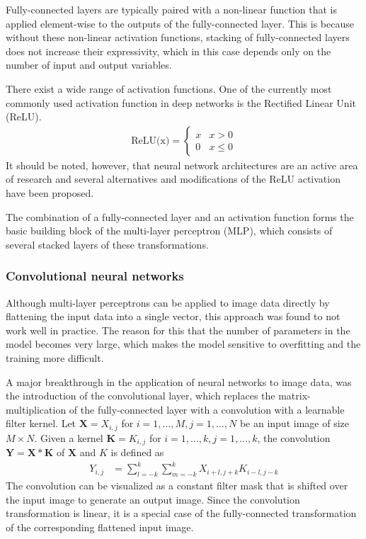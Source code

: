 \begin{description}
  Fully-connected layers are typically paired with a non-linear function that is
  applied element-wise to the outputs of the fully-connected layer. This is
  because without these non-linear activation functions, stacking of
  fully-connected layers does not increase their expressivity, which in this
  case depends only on the number of input and output variables.

  There exist a wide range of activation functions. One of the currently most
  commonly used activation function in deep networks is the Rectified Linear
  Unit (ReLU).
  \begin{align}
    \text{ReLU(x)} = \begin{cases}
      x & x > 0 \\
      0 & x \leq 0
    \end{cases}
  \end{align}
  It should be noted, however, that neural network architectures are an active area of
  research and several alternatives and modifications of the ReLU activation have
  been proposed.

  The combination of a fully-connected layer and an activation function forms
  the basic building block of the multi-layer perceptron (MLP), which consists
  of several stacked layers of these transformations.

\subsubsection{Convolutional neural networks}

Although multi-layer perceptrons can be applied to image data directly by
flattening the input data into a single vector, this approach was found to not
work well in practice. The reason for this that the number of parameters in the
model becomes very large, which makes the model sensitive to overfitting and the
training more difficult.

A major breakthrough in the application of neural networks to image data, was the
introduction of the convolutional layer, which replaces the matrix-multiplication
of the fully-connected layer with a convolution with a learnable filter kernel.
Let $\bm{X} = X_{i, j}$ for $i = 1, \dots, M, j = 1, \ldots, N$ be an input image
of size $M \times N$. Given a kernel $\bm{K} = K_{i, j}$ for
$i = 1, \ldots, k, j = 1, \ldots, k$, the convolution $\bm{Y} = \bm{X} * \bm{K}$ of
$\bm{X}$ and $K$ is defined as
\begin{align}
  Y_{i, j} &= \sum_{l=-k}^{k} \sum_{m=-k}^{k} X_{i + l, j + k} K_{i - l, j -k}
\end{align}
The convolution can be visualized as a constant filter mask that is shifted over
the input image to generate an output image. Since the convolution
transformation is linear, it is a special case of the fully-connected
transformation of the corresponding flattened input image.


\end{description}

